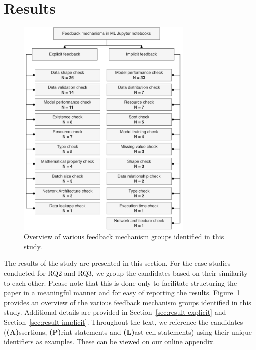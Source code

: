 \section{Results}


\begin{figure}
  \centering
  \includegraphics[width=0.75\textwidth]{taxonomy.pdf}
  \caption{Overview of various feedback mechanism groups identified in this study.}
  \label{fig:taxonomy}
\end{figure}

The results of the study are presented in this section. For the case-studies conducted for RQ2 and RQ3, we group the candidates based on their similarity to each other. Please note that this is done only to facilitate structuring the paper in a meaningful manner and for easy of reporting the results. Figure~\ref{fig:taxonomy} provides an overview of the various feedback mechanism groups identified in this study. Additional details are provided in Section~\ref{sec:result-explicit} and Section~\ref{sec:result-implicit}. Throughout the text, we reference the candidates (\textbf{(A)}ssertions, \textbf{(P)}rint statements and \textbf{(L)}ast cell statements) using their unique identifiers as examples. These can be viewed on our online appendix.

